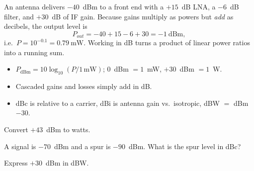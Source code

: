 \begin{workedexample}
An antenna delivers $-40$~dBm to a front end with a $+15$~dB LNA, a
$-6$~dB filter, and $+30$~dB of IF gain. Because gains multiply as powers but
\emph{add} as decibels, the output level is
\[ P_{out} = -40 + 15 - 6 + 30 = -1\ \text{dBm}, \]
i.e.\ $P = 10^{-0.1} = 0.79\ \text{mW}$. Working in dB turns a product of linear
power ratios into a running sum.
\end{workedexample}

\begin{keytakeaways}
\begin{itemize}[leftmargin=1.4em,itemsep=2pt]
\item $P_{\text{dBm}} = 10\log_{10}(P/1\,\text{mW})$; $0$~dBm $=1$~mW, $+30$~dBm $=1$~W.
\item Cascaded gains and losses simply add in dB.
\item dBc is relative to a carrier, dBi is antenna gain vs.\ isotropic, dBW $=$ dBm $-30$.
\end{itemize}
\end{keytakeaways}

\begin{exercises}
\item Convert $+43$~dBm to watts.
\item A signal is $-70$~dBm and a spur is $-90$~dBm. What is the spur level in dBc?
\item Express $+30$~dBm in dBW.
\end{exercises}

